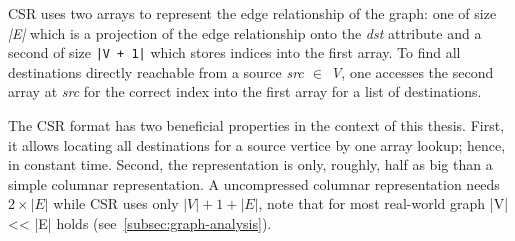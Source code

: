 CSR uses two arrays to represent the edge relationship of the graph: one of size \textit{|E|} which is a projection of the edge relationship
onto the \textit{dst} attribute and a second of size \texttt{|V + 1|} which stores indices into the first array.
To find all destinations directly reachable from a source \textit{src $\in$ V}, one accesses the second array at \textit{src} for the
correct index into the first array for a list of destinations.

The CSR format has two beneficial properties in the context of this thesis.
First, it allows locating all destinations for a source vertice by one array lookup;
hence, in constant time.
Second, the representation is only, roughly, half as big than a simple columnar representation.
A uncompressed columnar representation needs $2 \times |E|$ while CSR uses only $|V| + 1 + |E|$, note that for most real-world graph |V|
<< |E| holds (see~\cref{subsec:graph-analysis}).

